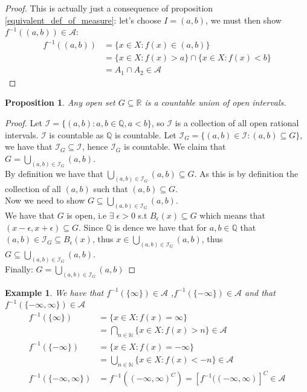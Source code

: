 \documentclass{article}
\newcommand{\R}{\mathbb{R}}
\newcommand{\N}{\mathbb{N}}
\newcommand{\A}{\mathcal{A}}
\newcommand{\I}{\mathcal{I}}
\newtheorem{prop}{Proposition}
\newtheorem{ex}{Example}
\newtheorem{proof}{Proof}
\begin{document}
\begin{proof}
This is actually just a consequence of proposition \ref{equivalent_def_of_measure}: let's choose $I = (a,b)$, we must then show $f^{-1}((a,b)) \in \A$: 
\begin{align*}
f^{-1}((a,b)) &= \{x\in X: f(x)\in (a,b)\}\\ 
&= \{x\in X: f(x)>a\}\cap \{x\in X: f(x) < b\} \\ 
&= A_{1}\cap A_{2} \in \A
\end{align*}
\end{proof}

\begin{prop}
\label{open set is a countable union of open sets}
Any open set $G\subseteq \R$ is a countable union of open intervals.
\end{prop}

\begin{proof}
Let $\mathcal{I} = \{(a,b): a,b \in \mathbb{Q}, a<b\}$, so $\mathcal{I}$ is a collection of all open rational intervals. $\mathcal{I}$ is countable as $\mathbb{Q}$ is countable. Let $\mathcal{I}_{G} = \{(a,b)\in \mathcal{I}: (a,b) \subseteq G\}$, we have that $\mathcal{I}_{G} \subseteq \mathcal{I}$, hence $\mathcal{I}_{G}$ is countable. We claim that $G = \bigcup_{(a,b)\in \mathcal{I}_{G}}(a,b)$.\\ 
By definition we have that $\bigcup_{(a,b)\in \mathcal{I}_{G}}(a,b) \subseteq G$. As this is by definition the collection of all $(a,b)$ such that $(a,b) \subseteq G$. \\ 
Now we need to show $G \subseteq \bigcup_{(a,b)\in \mathcal{I}_{G}}(a,b)$.\\ 
We have that $G$ is open, i.e $\exists\; \epsilon > 0$ s.t $B_{\epsilon}(x)\subseteq G$ which means that\\
$(x-\epsilon, x+ \epsilon) \subseteq G$. Since $\mathbb{Q}$ is dence we have that for $a,b\in \mathbb{Q}$ that \\ 
$(a,b) \in \I_{G} \subseteq B_{\epsilon}(x)$, thus $x\in \bigcup_{(a,b)\in \mathcal{I}_{G}}(a,b)$, thus $G\subseteq \bigcup_{(a,b)\in \mathcal{I}_{G}}(a,b)$. \\ 
Finally: $G = \bigcup_{(a,b)\in \mathcal{I}_{G}}(a,b) $
\end{proof}

\begin{ex}
\label{measurability involving infinity}
We have that $f^{-1}(\{\infty\}) \in \A$ ,$f^{-1}(\{-\infty\})\in \A$ and that $f^{-1}(\{-\infty, \infty\}) \in \A$ 
\begin{align*}
f^{-1}(\{\infty\}) &= \{x\in X: f(x) = \infty\}\\ 
&= \bigcap_{n\in\N}\{x\in X: f(x) > n\} \in \A \\ 
f^{-1}(\{-\infty\}) &= \{x\in X: f(x) = -\infty\} \\ 
&= \bigcup_{n\in \N}\{x\in X: f(x) < -n\} \in \A \\ 
f^{-1}(\{-\infty, \infty\}) &= f^{-1}((-\infty, \infty)^{C}) = [f^{-1}((-\infty, \infty)]^{C} \in \A 
\end{align*}
\end{ex} 
\end{document}
